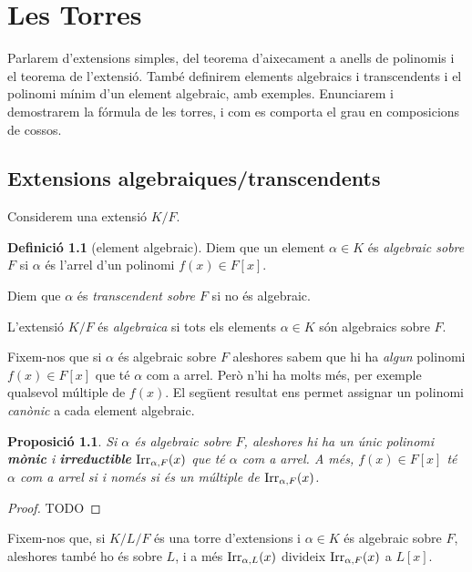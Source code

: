 \documentclass[
]{book}
\newtheorem{proposition}{Proposició}[chapter]
\theoremstyle{definition}
\newtheorem{definition}{Definició}[chapter]
\theoremstyle{definition}
\theoremstyle{definition}
\theoremstyle{definition}
\theoremstyle{remark}
\begin{document}
\hypertarget{les-torres}{%
\chapter{Les Torres}\label{les-torres}}

Parlarem d'extensions simples, del teorema d'aixecament a anells de polinomis i el teorema de l'extensió.
També definirem elements algebraics i transcendents i el polinomi mínim d'un element algebraic, amb exemples.
Enunciarem i demostrarem la fórmula de les torres, i com es comporta el grau en composicions de cossos.

\hypertarget{extensions-algebraiquestranscendents}{%
\section{Extensions algebraiques/transcendents}\label{extensions-algebraiquestranscendents}}

Considerem una extensió \(K/F\).

\begin{definition}[element algebraic]
Diem que un element \(\alpha\in K\) és \emph{algebraic sobre \(F\)} si \(\alpha\) és l'arrel d'un polinomi \(f(x)\in F[x]\).

Diem que \(\alpha\) és \emph{transcendent sobre \(F\)} si no és algebraic.

L'extensió \(K/F\) és \emph{algebraica} si tots els elements \(\alpha\in K\) són algebraics sobre \(F\).
\end{definition}

Fixem-nos que si \(\alpha\) és algebraic sobre \(F\) aleshores sabem que hi ha \emph{algun} polinomi \(f(x)\in F[x]\) que té \(\alpha\)
com a arrel. Però n'hi ha molts més, per exemple qualsevol múltiple de \(f(x)\). El següent resultat ens permet assignar un
polinomi \emph{canònic} a cada element algebraic.

\begin{proposition}
Si \(\alpha\) és algebraic sobre \(F\), aleshores hi ha un únic polinomi \textbf{mònic} i \textbf{irreductible} \(\operatorname{Irr}_{\alpha,F}(x)\) que
té \(\alpha\) com a arrel. A més, \(f(x)\in F[x]\) té \(\alpha\) com a arrel si i només si és un múltiple de \(\operatorname{Irr}_{\alpha, F}(x)\).
\end{proposition}

\begin{proof}
TODO
\end{proof}

Fixem-nos que, si \(K/L/F\) és una torre d'extensions i \(\alpha\in K\) és algebraic sobre \(F\), aleshores també ho és sobre \(L\),
i a més \(\operatorname{Irr}_{\alpha,L}(x)\) divideix \(\operatorname{Irr}_{\alpha,F}(x)\) a \(L[x]\).
\end{document}
